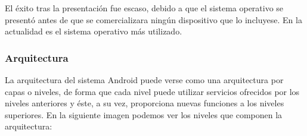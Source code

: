 El éxito tras la presentación fue escaso, debido a que el sistema operativo se presentó antes de que se comercializara ningún dispositivo que lo incluyese. En la actualidad es el sistema operativo más utilizado.

\subsubsection{Arquitectura}

La arquitectura del sistema Android puede verse como una arquitectura por capas o niveles, de forma que cada nivel puede utilizar servicios ofrecidos por los niveles anteriores y éste, a su vez, proporciona nuevas funciones a los niveles superiores. En la siguiente imagen podemos ver los niveles que componen la arquitectura:


